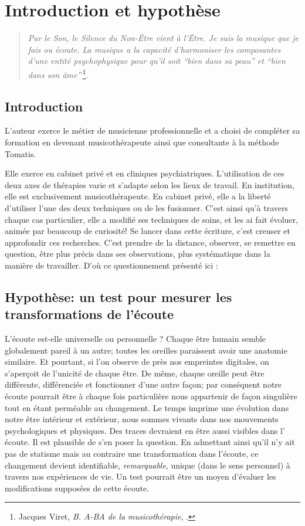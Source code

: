 \chapter{Introduction et hypothèse}
\begin{quotation}
\emph{Par le Son, le Silence du Non-Être vient à l'Être. Je suis
la musique que je fais ou écoute. La musique a la capacité d'harmoniser
les composantes d'une entité psychophysique pour qu'il soit ``bien
dans sa peau'' et ``bien dans son âme''}\,\footnote{Jacques Viret, \emph{B. A-BA de la musicothérapie}, \cite{viret:b}.}.
\end{quotation}

\section{Introduction}

L'auteur exerce le métier de musicienne professionnelle et a  choisi de compléter sa formation en devenant musicothérapeute  ainsi que consultante à la méthode Tomatis.  



Elle exerce en cabinet privé et en cliniques psychiatriques. L'utilisation de ces deux axes de thérapies varie et s'adapte selon les lieux de travail. En institution, elle est exclusivement musicothérapeute. En cabinet
privé, elle a la liberté d'utiliser l'une des deux techniques ou de les fusionner.
C'est ainsi qu'à travers chaque cas particulier,
elle a modifié ses techniques de soins, et les ai fait évoluer, animée par beaucoup de curiosité! Se lancer dans cette écriture, c'est creuser et approfondir ces recherches. C'est prendre de la distance, observer, se remettre en question, être plus précis dans ses observations, plus systématique dans la manière de travailler. D'où ce questionnement présenté ici : 


\section{Hypothèse: un test pour mesurer les transformations de l'écoute}

L'écoute est-elle universelle ou personnelle ?
 Chaque être humain semble  globalement pareil à un autre; toutes les oreilles paraissent  avoir une anatomie similaire. Et pourtant, si l'on observe de près nos empreintes digitales, on s'aperçoit de l'unicité de chaque être. De même, chaque oreille peut être différente, différenciée et  fonctionner d'une autre façon;  par conséquent notre  écoute pourrait être à chaque fois particulière nous appartenir de façon singulière tout en étant perméable au changement.
Le temps imprime une évolution dans notre être intérieur et extérieur, nous sommes vivants dans nos mouvements psychologiques et physiques. Des traces devraient en être aussi visibles dans l' écoute. Il est plausible de s'en poser la question.
En admettant ainsi qu'il n'y ait pas de statisme mais au contraire une transformation dans l'écoute, ce changement devient identifiable, \textit{remarquable}, unique (dans le sens personnel) à travers nos expériences de vie.  Un test pourrait être un moyen d'évaluer les modifications supposées de cette écoute. 


